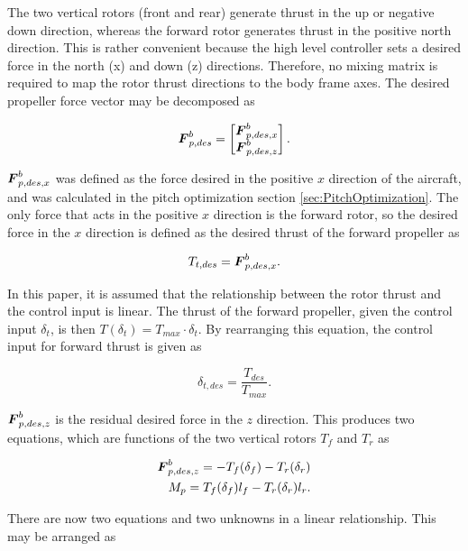 The two vertical rotors (front and rear) generate thrust in the up or negative down direction, whereas the forward rotor generates thrust in the positive north direction. 
This is rather convenient because the high level controller sets a desired force in the north (x) and down (z) directions.
Therefore, no mixing matrix is required to map the rotor thrust directions to the body frame axes.
The desired propeller force vector may be decomposed as 

\begin{align}
    \boldsymbol{F}^b_{p,des} =
    \begin{bmatrix}
        \boldsymbol{F}^b_{p,des,x}\\
        \boldsymbol{F}^b_{p,des,z}
    \end{bmatrix}.
\end{align}

$\boldsymbol{F}^b_{p,des,x}$ was defined as the force desired in the positive $x$ direction of the aircraft, and was calculated in the pitch optimization section \ref{sec:PitchOptimization}.
The only force that acts in the positive $x$ direction is the forward rotor, so the desired force in the $x$ direction is defined as the desired thrust of the forward propeller as

\begin{equation}
    T_{t,des} = \boldsymbol{F}^b_{p,des,x}.
\end{equation}

In this paper, it is assumed that the relationship between the rotor thrust and the control input is linear.
The thrust of the forward propeller, given the control input $\delta_t$, is then $T(\delta_t) = T_{max} \cdot \delta_t$.
By rearranging this equation, the control input for forward thrust is given as

\begin{equation}
    \delta_{t,des} = \frac{T_{des}}{T_{max}}.
\end{equation}

$\boldsymbol{F}^b_{p,des,z}$ is the residual desired force in the $z$ direction. 
This produces two equations, which are functions of the two vertical rotors $T_{f}$ and $T_{r}$ as

\begin{align}
    \boldsymbol{F}^b_{p,des,z} = -T_f(\delta_f) - T_r(\delta_r)\\
    M_p = T_f(\delta_f) l_f - T_r(\delta_r) l_r.
\end{align}

There are now two equations and two unknowns in a linear relationship. 
This may be arranged as

